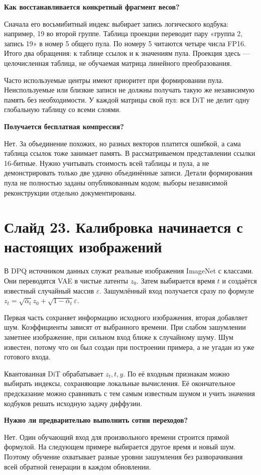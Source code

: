 \documentclass[a4paper,11pt]{article}
\newcommand{\slide}[2]{\clearpage\section*{Слайд #1. #2}}
\newcommand{\question}[1]{\par\textbf{#1}\par}
\begin{document}
\question{Как восстанавливается конкретный фрагмент весов?}
Сначала его восьмибитный индекс выбирает запись
логического кодбука: например, 19 во второй группе.
Таблица проекции переводит пару «группа 2, запись 19»
в номер 5 общего пула. По номеру 5 читаются четыре
числа FP16. Итого два обращения: к таблице ссылок
и к значениям пула. Проекция здесь --- целочисленная
таблица, не обучаемая матрица линейного преобразования.

Часто используемые центры имеют приоритет при формировании
пула. Неиспользуемые или близкие записи не должны
получать такую же независимую память без необходимости.
У каждой матрицы свой пул: вся DiT не делит одну
глобальную таблицу со всеми слоями.

\question{Получается бесплатная компрессия?}
Нет. За объединение похожих, но разных векторов платится
ошибкой, а сама таблица ссылок тоже занимает память.
В рассматриваемом представлении ссылки 16-битные.
Нужно учитывать стоимость всей таблицы и пула,
а не демонстрировать только две удачно объединённые записи.
Детали формирования пула не полностью заданы опубликованным кодом;
выборы независимой реконструкции отдельно документированы.

\slide{23}{Калибровка начинается с настоящих изображений}
В DPQ источником данных служат реальные изображения
ImageNet с классами. Они переводятся VAE в чистые
латенты $z_0$. Затем выбирается время $t$ и создаётся
известный случайный массив $\varepsilon$.
Зашумлённый вход получается сразу по формуле
$z_t=\sqrt{\bar\alpha_t}z_0+\sqrt{1-\bar\alpha_t}\varepsilon$.

Первая часть сохраняет информацию исходного изображения,
вторая добавляет шум. Коэффициенты зависят от выбранного
времени. При слабом зашумлении заметнее изображение,
при сильном вход ближе к случайному шуму.
Шум известен, потому что он был создан при построении примера,
а не угадан из уже готового входа.

Квантованная DiT обрабатывает $z_t,t,y$.
По её входным признакам можно выбирать индексы,
сохраняющие локальные вычисления. Её окончательное
предсказание можно сравнивать с тем самым известным шумом
и учить значения кодбуков решать исходную задачу диффузии.

\question{Нужно ли предварительно выполнить сотни переходов?}
Нет. Один обучающий вход для произвольного времени
строится прямой формулой. На следующем примере выбирается
другое время и новый шум. Поэтому обучение охватывает
разные уровни зашумления без разворачивания всей обратной
генерации в каждом обновлении.
\end{document}
